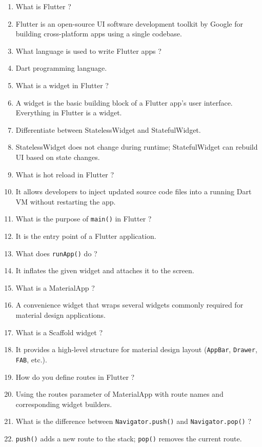 \documentclass{article}
\def \answer{\item[$\rightarrow$]}
\begin{document}
	\begin{enumerate}
		\item  What is Flutter ?
		\answer Flutter is an open-source UI software development toolkit by Google for building cross-platform apps using a single codebase.
		\\
		\item  What language is used to write Flutter apps ?
		\answer Dart programming language.
		\\
		\item  What is a widget in Flutter ?
		\answer A widget is the basic building block of a Flutter app's user interface. Everything in Flutter is a widget.
		\\
		\item  Differentiate between StatelessWidget and StatefulWidget.
		\answer StatelessWidget does not change during runtime; StatefulWidget can rebuild UI based on state changes.
		\\
		\item  What is hot reload in Flutter ?
		\answer It allows developers to inject updated source code files into a running Dart VM without restarting the app.
		\\
		\item  What is the purpose of \texttt{main()} in Flutter ?
		\answer It is the entry point of a Flutter application.
		\\
		\item  What does \texttt{runApp()} do ?
		\answer It inflates the given widget and attaches it to the screen.
		\\
		\item  What is a MaterialApp ?
		\answer A convenience widget that wraps several widgets commonly required for material design applications.
		\\
		\item  What is a Scaffold widget ?
		\answer It provides a high-level structure for material design layout (\texttt{AppBar}, \texttt{Drawer}, \texttt{FAB}, etc.).
		\\
		\item  How do you define routes in Flutter ?
		\answer Using the routes parameter of MaterialApp with route names and corresponding widget builders.
		\\
		\item  What is the difference between \texttt{Navigator.push()} and \texttt{Navigator.pop()} ?
		\answer \texttt{push()} adds a new route to the stack; \texttt{pop()} removes the current route.

\end{enumerate}
\end{document}
